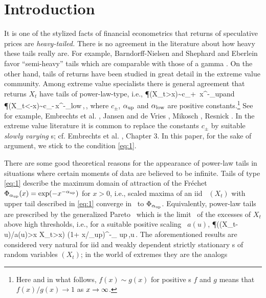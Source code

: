 \section{Introduction}\setcounter{equation}{0}
It is one of the stylized facts of financial econometrics that 
returns of speculative prices are {\em heavy-tailed.} There is no agreement
in the literature about how heavy these tails really are. For example,
Barndorff-Nielsen and Shephard \cite{barndorff:shephard:2001} and
Eberlein \cite{eberlein:2001} favor ``semi-heavy'' tails
which are comparable with those of a gamma \ds . On the other
hand, tails of returns have been studied in great detail 
in the extreme value community. Among extreme value specialists
there is general agreement that returns $X_t$ have tails of power-law-type, i.e.,
\beam\label{eq:1}
\P(X_t>x)\sim c_+ \,x^{-\alpha_{\rm up}}\quad\mbox{and}\quad
\P(X_t<-x)\sim c_-\,x^{-\alpha_{\rm low}}\,,\quad\xto\,,
\eeam  
where $c_{\pm}$, $\alpha_{\rm up}$ and $\alpha_{\rm low}$ are positive
constants.\footnote{Here and in what follows, $f(x)\sim g(x)$ for
  positive \fct s $f$ and $g$ means that $f(x)/g(x)\to 1$ as $x\to\infty$.}
See for example, Embrechts et
al. \cite{embrechts:klueppelberg:mikosch:1997}, Jansen and de Vries
\cite{jansen1991frequency}, Mikosch \cite{mikosch:2003}, Resnick 
\cite{resnick:2007}. In the extreme value literature it is common to
replace the constants $c_\pm$ by suitable {\em slowly varying} \fct s;
cf. Embrechts et al. \cite{embrechts:klueppelberg:mikosch:1997},
Chapter 3. In this paper, for the sake of argument, we stick to the condition \eqref{eq:1}.
\par
There are some good theoretical reasons for the appearance of
power-law tails in situations where certain moments 
of data are believed to be infinite. Tails of type \eqref{eq:1}
describe the maximum domain of attraction of the  
Fr\'echet \ds\ $\Phi_{\alpha_{\rm up}}(x)=\exp(-x^{-\alpha_{\rm up}})$
for $x>0$, i.e., scaled maxima of an iid \seq\ $(X_t)$ with
upper tail described in \eqref{eq:1} converge in \ds\ to $\Phi_{\alpha_{\rm up}}$.
Equivalently, power-law tails are prescribed by the 
generalized Pareto \ds\ which is the limit \ds\ of the excesses of
$X_t$ above high thresholds, i.e., for a suitable positive scaling
\fct\ $a(u)$,
\beao
\P((X_t-u)/a(u)>x \mid X_t>x) \to (1+ x/\alpha_{\rm up})^{-\alpha_{\rm
    up}}\,,\qquad u\to\infty\,.
\eeao
The aforementioned results 
are considered very natural for iid and weakly dependent strictly stationary \seq s of random variables $(X_t)$; 
in the world of extremes they are the analogs
